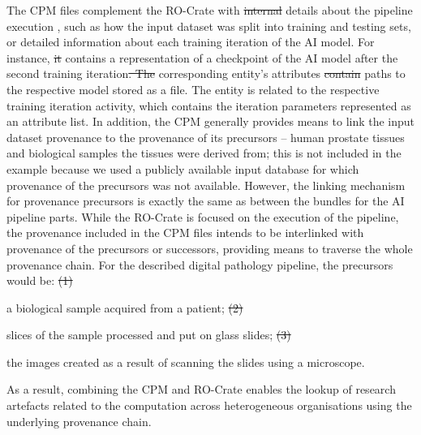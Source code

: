 \documentclass[10pt,letterpaper]{article}
\providecommand{\DIFaddtex}[1]{{\protect\color{blue}\uwave{#1}}} %
\providecommand{\DIFdeltex}[1]{{\protect\color{red}\sout{#1}}}                      %
\providecommand{\DIFaddbegin}{} %
\providecommand{\DIFaddend}{} %
\providecommand{\DIFdelbegin}{} %
\providecommand{\DIFdelend}{} %
\providecommand{\DIFadd}[1]{\texorpdfstring{\DIFaddtex{#1}}{#1}} %
\providecommand{\DIFdel}[1]{\texorpdfstring{\DIFdeltex{#1}}{}} %
\newcommand{\DIFscaledelfig}{0.5}
\newlength{\DIFdelgraphicswidth} %
\newlength{\DIFdelgraphicsheight} %
\newcommand{\DIFaddincludegraphics}[2][]{{\color{blue}\fbox{\DIFOincludegraphics[#1]{#2}}}} %
\newcommand{\DIFdelincludegraphics}[2][]{%
\sbox{\DIFdelgraphicsbox}{\DIFOincludegraphics[#1]{#2}}%
\settoboxwidth{\DIFdelgraphicswidth}{\DIFdelgraphicsbox} %
\settoboxtotalheight{\DIFdelgraphicsheight}{\DIFdelgraphicsbox} %
\scalebox{\DIFscaledelfig}{%
\parbox[b]{\DIFdelgraphicswidth}{\usebox{\DIFdelgraphicsbox}\\[-\baselineskip] \rule{\DIFdelgraphicswidth}{0em}}\llap{\resizebox{\DIFdelgraphicswidth}{\DIFdelgraphicsheight}{%
\setlength{\unitlength}{\DIFdelgraphicswidth}%
\begin{picture}(1,1)%
\thicklines\linethickness{2pt} %
{\color[rgb]{1,0,0}\put(0,0){\framebox(1,1){}}}%
{\color[rgb]{1,0,0}\put(0,0){\line( 1,1){1}}}%
{\color[rgb]{1,0,0}\put(0,1){\line(1,-1){1}}}%
\end{picture}%
}\hspace*{3pt}}} %
} %
\DeclareRobustCommand{\DIFaddbegin}{\DIFOaddbegin \let\includegraphics\DIFaddincludegraphics} %
\DeclareRobustCommand{\DIFaddend}{\DIFOaddend \let\includegraphics\DIFOincludegraphics} %
\DeclareRobustCommand{\DIFdelbegin}{\DIFOdelbegin \let\includegraphics\DIFdelincludegraphics} %
\DeclareRobustCommand{\DIFdelend}{\DIFOaddend \let\includegraphics\DIFOincludegraphics} %
\begin{document}
\DIFaddend The CPM files complement the RO-Crate with \DIFdelbegin \DIFdel{internal }\DIFdelend details about the pipeline execution \DIFaddbegin \DIFadd{process}\DIFaddend , such as how the input dataset was split into training and testing sets, or detailed information about each training iteration of the AI model.
For instance, \DIFdelbegin \DIFdel{it }\DIFdelend \DIFaddbegin \DIFadd{the RO-Crate }\DIFaddend contains a representation of a checkpoint of the AI model after the second training iteration\DIFdelbegin \DIFdel{.
The }\DIFdelend \DIFaddbegin \DIFadd{, with the }\DIFaddend corresponding entity's attributes \DIFdelbegin \DIFdel{contain }\DIFdelend \DIFaddbegin \DIFadd{containing }\DIFaddend paths to the respective model stored as a file.
The entity is related to the respective training iteration activity, which contains the iteration parameters represented as an attribute list.
In addition, the CPM generally provides means to link the input dataset provenance to the provenance of its precursors -- human prostate tissues and biological samples the tissues were derived from; this is not included in the example because we used a publicly available input database for which provenance of the precursors was not available.
However, the linking mechanism for provenance precursors is exactly the same as between the bundles for the AI pipeline parts.
While the RO-Crate is focused on the execution of the pipeline, the provenance included in the CPM files intends to be interlinked with provenance of the precursors or successors, providing means to traverse the whole provenance chain.
For the described digital pathology pipeline, the precursors would be:
\DIFdelbegin \DIFdel{(1) }\DIFdelend \DIFaddbegin \begin{inlineenum}
\item \DIFaddend a biological sample acquired from a patient;
\DIFdelbegin \DIFdel{(2) }\DIFdelend \DIFaddbegin \item \DIFaddend slices of the sample processed and put on glass slides;
\DIFdelbegin \DIFdel{(3) }\DIFdelend \DIFaddbegin \item \DIFaddend the images created as a result of scanning the slides using a microscope.
\DIFaddbegin \end{inlineenum}
\DIFaddend As a result, combining the CPM and RO-Crate enables the lookup of research artefacts related to the computation across heterogeneous organisations using the underlying provenance chain.
\end{document}
